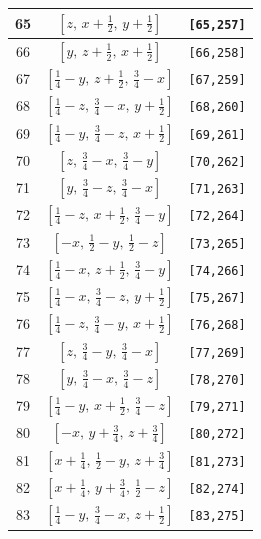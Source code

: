 \documentclass[fleqn,8pt]{jsarticle}
\begin{document}
\begin{longtable}{ccc}
65 & $\left[ z,\, x + \frac{1}{2},\, y + \frac{1}{2} \right]$ & {\tt [65,257]} \\ \hline
66 & $\left[ y,\, z + \frac{1}{2},\, x + \frac{1}{2} \right]$ & {\tt [66,258]} \\ \hline
67 & $\left[ \frac{1}{4} - y,\, z + \frac{1}{2},\, \frac{3}{4} - x \right]$ & {\tt [67,259]} \\ \hline
68 & $\left[ \frac{1}{4} - z,\, \frac{3}{4} - x,\, y + \frac{1}{2} \right]$ & {\tt [68,260]} \\ \hline
69 & $\left[ \frac{1}{4} - y,\, \frac{3}{4} - z,\, x + \frac{1}{2} \right]$ & {\tt [69,261]} \\ \hline
70 & $\left[ z,\, \frac{3}{4} - x,\, \frac{3}{4} - y \right]$ & {\tt [70,262]} \\ \hline
71 & $\left[ y,\, \frac{3}{4} - z,\, \frac{3}{4} - x \right]$ & {\tt [71,263]} \\ \hline
72 & $\left[ \frac{1}{4} - z,\, x + \frac{1}{2},\, \frac{3}{4} - y \right]$ & {\tt [72,264]} \\ \hline
73 & $\left[ - x,\, \frac{1}{2} - y,\, \frac{1}{2} - z \right]$ & {\tt [73,265]} \\ \hline
74 & $\left[ \frac{1}{4} - x,\, z + \frac{1}{2},\, \frac{3}{4} - y \right]$ & {\tt [74,266]} \\ \hline
75 & $\left[ \frac{1}{4} - x,\, \frac{3}{4} - z,\, y + \frac{1}{2} \right]$ & {\tt [75,267]} \\ \hline
76 & $\left[ \frac{1}{4} - z,\, \frac{3}{4} - y,\, x + \frac{1}{2} \right]$ & {\tt [76,268]} \\ \hline
77 & $\left[ z,\, \frac{3}{4} - y,\, \frac{3}{4} - x \right]$ & {\tt [77,269]} \\ \hline
78 & $\left[ y,\, \frac{3}{4} - x,\, \frac{3}{4} - z \right]$ & {\tt [78,270]} \\ \hline
79 & $\left[ \frac{1}{4} - y,\, x + \frac{1}{2},\, \frac{3}{4} - z \right]$ & {\tt [79,271]} \\ \hline
80 & $\left[ - x,\, y + \frac{3}{4},\, z + \frac{3}{4} \right]$ & {\tt [80,272]} \\ \hline
81 & $\left[ x + \frac{1}{4},\, \frac{1}{2} - y,\, z + \frac{3}{4} \right]$ & {\tt [81,273]} \\ \hline
82 & $\left[ x + \frac{1}{4},\, y + \frac{3}{4},\, \frac{1}{2} - z \right]$ & {\tt [82,274]} \\ \hline
83 & $\left[ \frac{1}{4} - y,\, \frac{3}{4} - x,\, z + \frac{1}{2} \right]$ & {\tt [83,275]} \\ \hline

\end{longtable}
\end{document}
